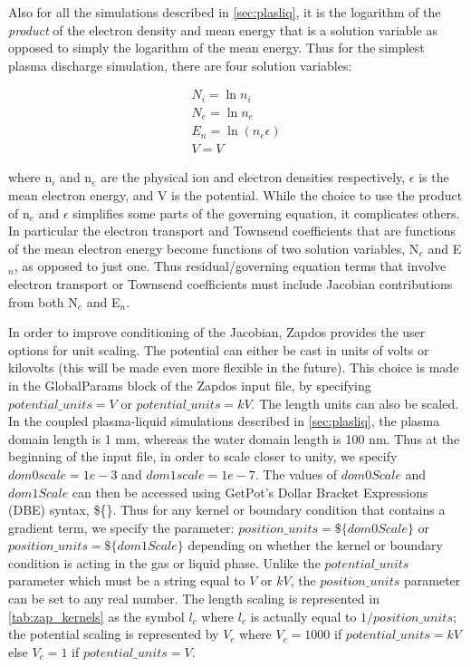 Also for all the simulations described in \cref{sec:plasliq}, it is the logarithm of the \textit{product} of the electron density and mean energy that is a solution variable as opposed to simply the logarithm of the mean energy. Thus for the simplest plasma discharge simulation, there are four solution variables:

\begin{gather}\label{eq:soln_vars}
  N_i = \ln n_i\\
  N_e = \ln n_e\\
  E_n = \ln\left(n_e\epsilon\right)\\
  V = V
\end{gather}

where n$_i$ and n$_e$ are the physical ion and electron densities respectively, $\epsilon$ is the mean electron energy, and V is the potential. While the choice to use the product of n$_e$ and $\epsilon$ simplifies some parts of the governing equation, it complicates others. In particular the electron transport and Townsend coefficients that are functions of the mean electron energy become functions of two solution variables, N$_e$ and E$_n$, as opposed to just one. Thus residual/governing equation terms that involve electron transport or Townsend coefficients must include Jacobian contributions from both N$_e$ and E$_n$.

In order to improve conditioning of the Jacobian, Zapdos provides the user options for unit scaling. The potential can either be cast in units of volts or kilovolts (this will be made even more flexible in the future). This choice is made in the GlobalParams block of the Zapdos input file, by specifying $potential\_units = V$ or $potential\_units = kV$. The length units can also be scaled. In the coupled plasma-liquid simulations described in \cref{sec:plasliq}, the plasma domain length is 1 mm, whereas the water domain length is 100 nm. Thus at the beginning of the input file, in order to scale closer to unity, we specify $dom0scale = 1e-3$ and $dom1scale = 1e-7$. The values of $dom0Scale$ and $dom1Scale$ can then be accessed using GetPot's Dollar Bracket Expressions (DBE) syntax, \$\{\}. Thus for any kernel or boundary condition that contains a gradient term, we specify the parameter: $position\_units = \$\{dom0Scale\}$ or $position\_units = \$\{dom1Scale\}$ depending on whether the kernel or boundary condition is acting in the gas or liquid phase. Unlike the $potential\_units$ parameter which must be a string equal to $V$ or $kV$, the $position\_units$ parameter can be set to any real number. The length scaling is represented in \cref{tab:zap_kernels} as the symbol $l_c$ where $l_c$ is actually equal to $1/position\_units$; the potential scaling is represented by $V_c$ where $V_c=1000$ if $potential\_units=kV$ else $V_c=1$ if $potential\_units=V$.

